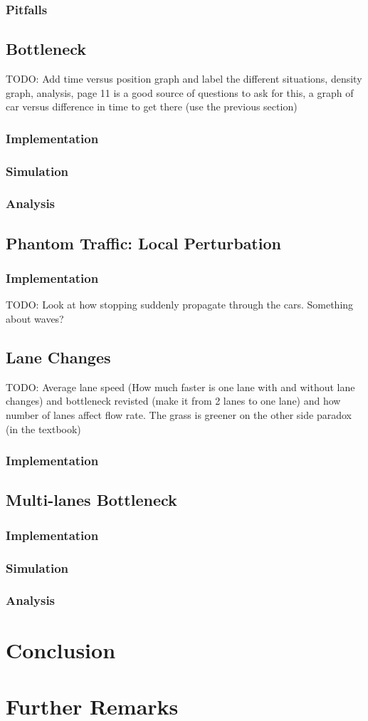 \documentclass[12pt]{article}
\begin{document}
    \subsubsection{Pitfalls}
    \subsection{Bottleneck}
    TODO: Add time versus position graph and label the different situations, density graph, analysis, page 11 is a good source of questions to ask for this, a graph of car versus difference in time to get there (use the previous section)
    \subsubsection{Implementation}
    \subsubsection{Simulation}
    \subsubsection{Analysis}
    \subsection{Phantom Traffic: Local Perturbation}
    \subsubsection{Implementation}
    TODO: Look at how stopping suddenly propagate through the cars. Something about waves? 
    \subsection{Lane Changes}
    TODO: Average lane speed (How much faster is one lane with and without lane changes) and bottleneck revisted (make it from 2 lanes to one lane) and how number of lanes affect flow rate. The grass is greener on the other side paradox (in the textbook) 
    \subsubsection{Implementation}
    \subsection{Multi-lanes Bottleneck}
    \subsubsection{Implementation}
    \subsubsection{Simulation}
    \subsubsection{Analysis}
    \section{Conclusion}
    \section{Further Remarks}
    \printunsrtglossary[type=symbols,style=long,title={List of Symbols and Constants}]
    \newpage 
    \printbibliography
\end{document}
